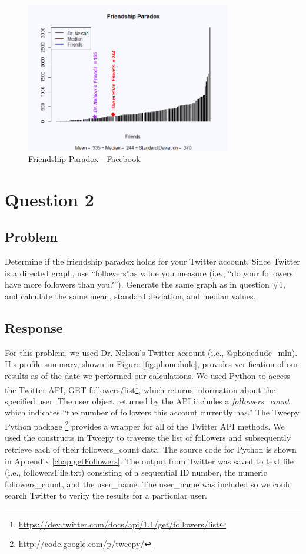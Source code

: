 \documentclass[letterpaper,11pt]{report}
\begin{document}
\begin{savenotes}
\begin{figure}[htbp]
	\centering
		\includegraphics[width=0.80\textwidth]{facebookParadox.png}
	\caption{Friendship Paradox - Facebook}
	\label{fig:facebookParadox}
\end{figure}

\section{Question 2}
\subsection{Problem}Determine if the friendship paradox holds for your Twitter account. Since Twitter is a directed graph, use ``followers''as value you measure (i.e., ``do your followers have more followers than you?''). Generate the same graph as in question \#1, and calculate the same mean, standard deviation, and median values.
\subsection{Response}For this problem, we used Dr. Nelson's Twitter account (i.e., @phonedude\_mln). His profile summary, shown in Figure \ref{fig:phonedude}, provides verification of our results as of the date we performed our calculations. We used Python to access the Twitter API, GET followers/list\footnote{\url{https://dev.twitter.com/docs/api/1.1/get/followers/list}}, which returns information about the specified user. The user object returned by the API includes a \emph{followers\_count} which indicates ``the number of followers this account currently has.'' The Tweepy Python package \footnote{\url{http://code.google.com/p/tweepy/}} provides a wrapper for all of the Twitter API methods. We used the constructs in Tweepy to traverse the list of followers and subsequently retrieve each of their followers\_count data. The source code for Python is shown in Appendix \ref{chap:getFollowers}. The output from Twitter was saved to text file (i.e., followersFile.txt) consisting of a sequential ID number, the numeric followers\_count, and the user\_name. The user\_name was included so we could search Twitter to verify the results for a particular user.


\end{savenotes}
\end{document}
